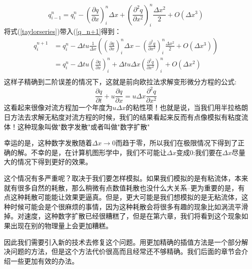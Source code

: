 \documentclass{article}
\begin{document}
\begin{equation}
q^n_{i-1}=q_i^n-\left (\frac{\partial{q}}{\partial{x}}\right)^n_i\Delta{x}+\left(\frac{\partial^2{q}}{\partial{x}^2}\right)^n_i\frac{\Delta{x}^2}{2}+O(\Delta{x}^3) \label{taylorseries}
\end{equation}
将式(\ref{taylorseries})带入(\ref{q_n+1}得到：
\begin{equation}
\begin{aligned}
q_i^{n+1}&=q_i^n-\Delta{t}u\frac{1}{\Delta{x}}\left(\left(\frac{\partial{q}}{\partial{x}}\right)^n_i\Delta{x}-\left(\frac{\partial^2{q}}{\partial{x}^2}\right)^n_i\frac{\Delta{x}^2}{2}+O(\Delta{x^3})\right) \\
&=q_i^n-\Delta{t}u\left(\frac{\partial{q}}{\partial{x}}\right)^n_i+\Delta{t}u\Delta{x}\left(\frac{\partial^2{q}}{\partial{x}^2}\right)^n_i+O(\Delta{x}^2) \\
\end{aligned}
\end{equation}
这样子精确到二阶误差的情况下，这就是前向欧拉法求解变形微分方程的公式:
\begin{equation}
\frac{\partial{q}}{\partial{t}}+u\frac{\partial{q}}{\partial{x}}=u\Delta{x}\frac{\partial^2{q}}{\partial{x}^2}
\end{equation}
这看起来很像对流方程加一个年度为$u\Delta{x}$的粘性项！也就是说，当我们用半拉格朗日方法去求解无粘度对流方程的时候，我们的结果看起来反而有点像模拟有粘度流体！这种现象叫做"数字发散"或者叫做"数字扩散"
\par
幸运的是，这种数字发散随着$\Delta{x}\to{0}$而趋于零，所以我们在极限情况下得到了正确的解。不幸的是，在计算机图形学中，我们不可能让$\Delta{x}$变成0:我们要在$\Delta{x}$尽量大的情况下得到更好的效果。
\par
这个情况有多严重呢？取决于我们要怎样模拟。如果我们模拟的是有粘流体，本来就有很多自然的耗散，那么稍微有点数值耗散也没什么大关系--更为重要的是，有点这种耗散可能能让效果更逼真。但是，更大可能是我们想模拟的是无粘流体，这种时候可能会是个很麻烦的事情，因为这种耗散会将很多有趣的现象比如涡流平滑掉。对速度，这种数字扩散已经很糟糕了，但是在第六章，我们将看到这个现象如果出现在别的物理量上会更加糟糕。
\par
因此我们需要引入新的技术去修复这个问题。用更加精确的插值方法是一个部分解决问题的方法，但是这个方法代价很高而且经常还不够精确。我们后面的章节会介绍一些更加有效的办法。
\end{document}
